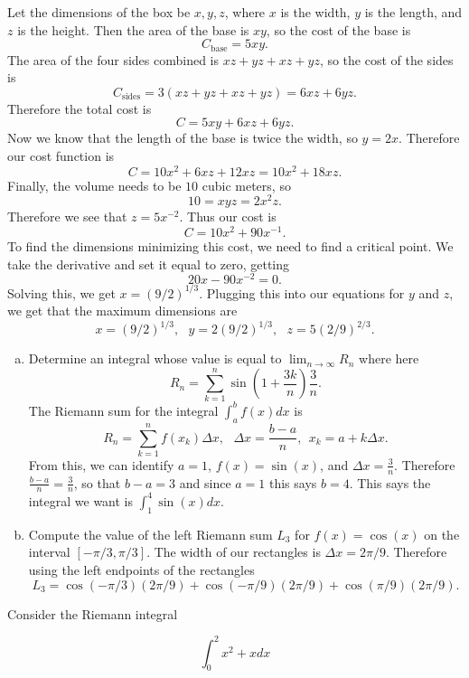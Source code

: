 \documentclass[11pt]{exam}
\theoremstyle{definition}
\begin{document}
\begin{questions}
Let the dimensions of the box be $x, y, z$, where $x$ is the width, $y$ is the length, and $z$ is the height.
Then the area of the base is $xy$, so the cost of the base is
$$C_{\text{base}} = 5xy.$$
The area of the four sides combined is $xz + yz + xz + yz$, so the cost of the sides is
$$C_{\text{sides}} = 3(xz + yz + xz + yz) = 6xz + 6yz.$$
Therefore the total cost is
$$C = 5xy + 6xz + 6yz.$$
Now we know that the length of the base is twice the width, so $y = 2x$.
Therefore our cost function is 
$$C = 10x^2 + 6xz + 12xz = 10x^2 + 18xz.$$
Finally, the volume needs to be $10$ cubic meters, so 
$$10 = xyz = 2x^2z.$$
Therefore we see that $z = 5x^{-2}$.
Thus our cost is
$$C = 10x^2 + 90x^{-1}.$$
To find the dimensions minimizing this cost, we need to find a critical point.
We take the derivative and set it equal to zero, getting
$$20x - 90x^{-2} = 0.$$
Solving this, we get $x = (9/2)^{1/3}$.  Plugging this into our equations for $y$ and $z$, we get that the maximum dimensions are
$$x = (9/2)^{1/3},\ \ \ y = 2(9/2)^{1/3},\ \ \ z = 5(2/9)^{2/3}.$$

\newpage
\question[10]\mbox{}

\begin{enumerate}[(a)]
\item  Determine an integral whose value is equal to $\lim_{n\rightarrow\infty} R_n$ where here
$$R_n = \sum_{k=1}^n \sin\left(1 + \frac{3k}{n}\right) \frac{3}{n}.$$
The Riemann sum for the integral $\int_a^b f(x)dx$ is
$$R_n = \sum_{k=1}^n f(x_k)\Delta x,\ \ \ \Delta x = \frac{b-a}{n},\ \ x_k = a + k\Delta x.$$
From this, we can identify $a=1$, $f(x) = \sin(x)$, and $\Delta x = \frac{3}{n}$.
Therefore $\frac{b-a}{n} = \frac{3}{n}$, so that $b-a=3$ and since $a =1$ this says $b=4$.
This says the integral we want is $\int_1^4 \sin(x)dx$.
\item  Compute the value of the left Riemann sum $L_3$ for $f(x) = \cos(x)$ on the interval $[-\pi/3,\pi/3]$.
The width of our rectangles is $\Delta x = 2\pi/9$.
Therefore using the left endpoints of the rectangles
$$L_3 = \cos(-\pi/3)(2\pi/9) + \cos(-\pi/9)(2\pi/9) + \cos(\pi/9)(2\pi/9).$$
\end{enumerate}

\newpage
\question[10]\mbox{}

Consider the Riemann integral

$$\int_0^2 x^2 + x dx$$


\end{questions}
\end{document}
